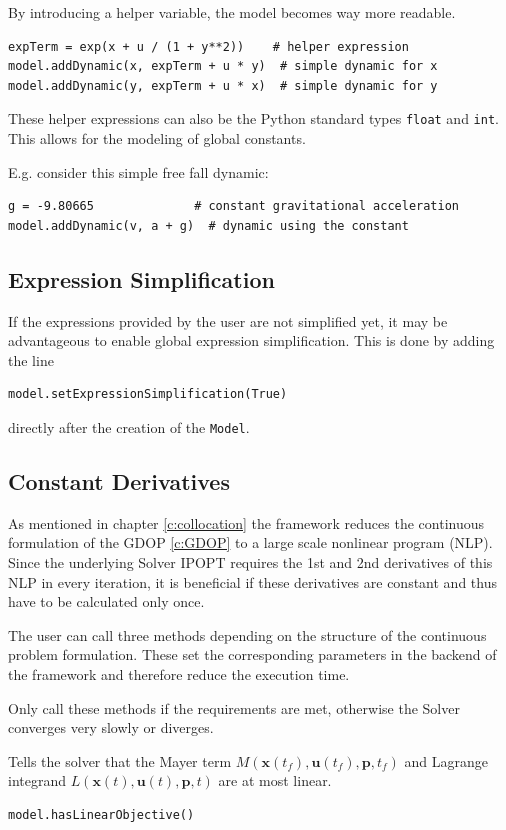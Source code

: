 \documentclass[12pt]{article}
\renewcommand{\v}{\bm}
\begin{document}
By introducing a helper variable, the model becomes way more readable.

\begin{lstlisting}
expTerm = exp(x + u / (1 + y**2))	 # helper expression
model.addDynamic(x, expTerm + u * y)  # simple dynamic for x
model.addDynamic(y, expTerm + u * x)  # simple dynamic for y
	\end{lstlisting}

These helper expressions can also be the Python standard types
\texttt{float} and \texttt{int}. This allows for the modeling of global
constants.

E.g. consider this simple free fall dynamic:
\begin{lstlisting}
g = -9.80665		      # constant gravitational acceleration  
model.addDynamic(v, a + g)  # dynamic using the constant
	\end{lstlisting}

\subsection{Expression Simplification}
If the expressions provided by the user are not simplified yet, it
may be advantageous to enable global expression simplification. This is done by
adding the line
\begin{lstlisting}
model.setExpressionSimplification(True)
	\end{lstlisting}
directly after the creation of the \texttt{Model}.

\subsection{Constant Derivatives}
As mentioned in chapter \ref{c:collocation} the framework reduces the
continuous formulation of the GDOP \ref{c:GDOP} to a large scale nonlinear
program (NLP). Since the underlying Solver IPOPT requires the 1st and 2nd
derivatives of this NLP in every iteration, it is beneficial if these
derivatives are constant and thus have to be calculated only once.

The user can call three methods depending on the structure of the
continuous problem formulation. These set the corresponding parameters in
the backend of the framework and therefore reduce the execution time.

Only call these methods if the requirements are met, otherwise the
Solver converges very slowly or diverges.

\begin{mdframed}[backgroundcolor=gray!10, roundcorner=10pt,
		linewidth=1pt]

	Tells the solver that the Mayer term $M(\v{x}(t_f), \v{u}(t_f),
		\v{p}, t_f)$ and Lagrange integrand $L(\v{x}(t), \v{u}(t),
		\v{p}, t)$ are at
	most linear.

	\begin{lstlisting}
model.hasLinearObjective()
		\end{lstlisting}
	\label{hasLinearObjective}
\end{mdframed}
\end{document}
